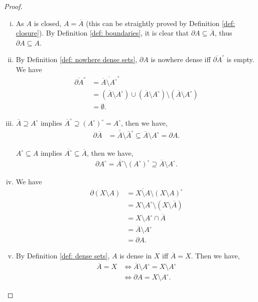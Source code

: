 \begin{proposition}
\begin{proof}
\begin{enumerate} [(i)]
			\item As $A$ is closed, $A = \overline A$ (this can be straightly proved by Definition \ref{def: closure}). By Definition \ref{def: boundaries}, it is clear that $\partial A \subseteq \overline A$, thus $\partial A \subseteq A$.
			
			\item
			By Definition \ref{def: nowhere dense sets}, $\partial A$ is nowhere dense iff $\overline{\partial A}^\circ$ is empty. We have
			$$
			\begin{aligned}
				\overline{\partial A}^\circ &= \overline{\overline A \setminus A^\circ}^\circ \\
				&= (\overline A \setminus A^\circ) \cup (\overline A \setminus A^\circ) \setminus (\overline A \setminus A^\circ) \\
				&= \emptyset.
			\end{aligned}			
			$$
			
			\item
			$\overline A \supseteq A^\circ$ implies $\overline A^\circ \supseteq (A^\circ)^\circ = A^\circ$, then we have,
			$$
			\begin{aligned}
				\partial \overline A &= \overline{\overline A} \setminus  \overline A^\circ \subseteq \overline A \setminus A^\circ = \partial A.
			\end{aligned}
			$$
			
			$A^\circ \subseteq A$ implies $ \overline{A^\circ} \subseteq \overline A$, then we have,
			$$
			\begin{aligned}
				\partial A^\circ = \overline{A^\circ} \setminus (A^\circ)^\circ \supseteq \overline A \setminus A^\circ.
			\end{aligned}
			$$
			
			\item
			We have
			$$
			\begin{aligned}
				\partial (X \setminus A) &= \overline{X \setminus A} \setminus (X \setminus A)^\circ \\
				&= X \setminus A^\circ \setminus (X \setminus \overline A) \\
				&= X \setminus A^\circ \cap \overline A \\
				&= \overline A \setminus A^\circ \\
				&= \partial A.
			\end{aligned}
			$$
			
			\item
			By Definition \ref{def: dense sets}, $A$ is dense  in $X$ iff $\overline A = X$. Then we have,
			$$
			\begin{aligned}
				\overline A = X &\iff \overline A \setminus A^\circ = X \setminus A^\circ \\
				&\iff \partial A = X \setminus A^\circ.
			\end{aligned}
			$$
		\end{enumerate}
	\end{proof}
\end{proposition}


